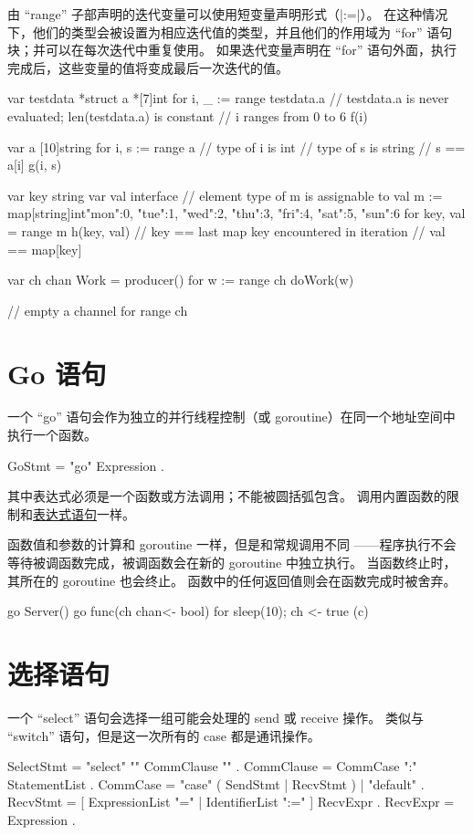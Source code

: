 由 ``range'' 子部声明的迭代变量可以使用短变量声明形式（\code|:=|）。
在这种情况下，他们的类型会被设置为相应迭代值的类型，并且他们的作用域为 ``for'' 语句块；并可以在每次迭代中重复使用。
如果迭代变量声明在 ``for'' 语句外面，执行完成后，这些变量的值将变成最后一次迭代的值。
\begin{golang}
var testdata *struct {
	a *[7]int
}
for i, _ := range testdata.a {
	// testdata.a is never evaluated; len(testdata.a) is constant
	// i ranges from 0 to 6
	f(i)
}

var a [10]string
for i, s := range a {
	// type of i is int
	// type of s is string
	// s == a[i]
	g(i, s)
}

var key string
var val interface {}  // element type of m is assignable to val
m := map[string]int{"mon":0, "tue":1, "wed":2, "thu":3, "fri":4, "sat":5, "sun":6}
for key, val = range m {
	h(key, val)
}
// key == last map key encountered in iteration
// val == map[key]

var ch chan Work = producer()
for w := range ch {
	doWork(w)
}

// empty a channel
for range ch {}
\end{golang}

\section{Go 语句} \label{sec:go statement}
一个 ``go'' 语句会作为独立的并行线程控制（或 goroutine）在同一个地址空间中执行一个函数。
\begin{EBNF}
GoStmt = "go" Expression .
\end{EBNF}

其中表达式必须是一个函数或方法调用；不能被圆括弧包含。
调用内置函数的限制和\hyperref[sec:expression statements]{表达式语句}一样。

函数值和参数的计算和 goroutine 一样，但是和常规调用不同
——程序执行不会等待被调函数完成，被调函数会在新的 goroutine 中独立执行。
当函数终止时，其所在的 goroutine 也会终止。
函数中的任何返回值则会在函数完成时被舍弃。
\begin{golang}
go Server()
go func(ch chan<- bool) { for { sleep(10); ch <- true }} (c)
\end{golang}

\section{选择语句}
一个 ``select'' 语句会选择一组可能会处理的 send 或 receive 操作。
类似与 ``switch'' 语句，但是这一次所有的 case 都是通讯操作。
\begin{EBNF}
SelectStmt = "select" "{" { CommClause } "}" .
CommClause = CommCase ":" StatementList .
CommCase   = "case" ( SendStmt | RecvStmt ) | "default" .
RecvStmt   = [ ExpressionList "=" | IdentifierList ":=" ] RecvExpr .
RecvExpr   = Expression .
\end{EBNF}


